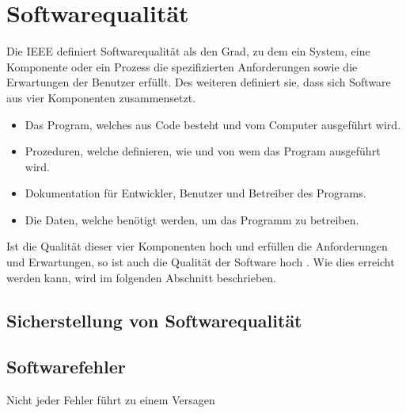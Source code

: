 
\section{Softwarequalität}
Die \ac{IEEE} definiert Softwarequalität als den Grad, zu dem ein System,
eine Komponente oder ein Prozess die spezifizierten Anforderungen sowie die Erwartungen der Benutzer erfüllt.
Des weiteren definiert sie, dass sich Software aus vier Komponenten zusammensetzt.
\begin{itemize}
   \item Das Program, welches aus Code besteht und vom Computer ausgeführt wird.
   \item Prozeduren, welche definieren, wie und von wem das Program ausgeführt wird.
   \item Dokumentation für Entwickler, Benutzer und Betreiber des Programs.
   \item Die Daten, welche benötigt werden, um das Programm zu betreiben.
\end{itemize}
Ist die Qualität dieser vier Komponenten hoch und erfüllen die Anforderungen und Erwartungen, so ist auch die Qualität der Software hoch \parencite{galin2004software}.
Wie dies erreicht werden kann, wird im folgenden Abschnitt beschrieben.

\subsection{Sicherstellung von Softwarequalität}



\subsection{Softwarefehler}
Nicht jeder Fehler führt zu einem Versagen